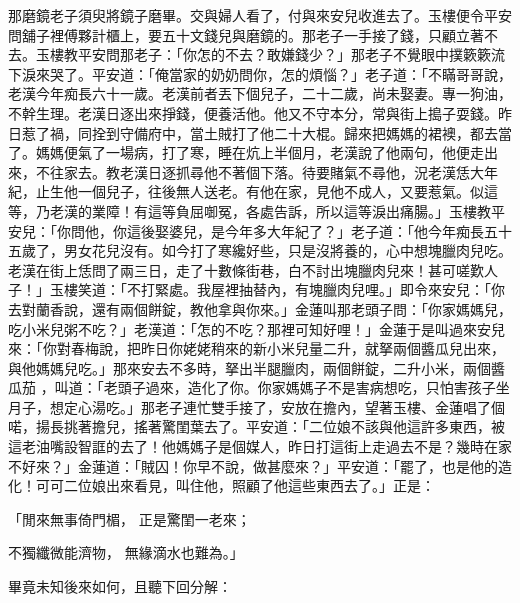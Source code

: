 那磨鏡老子須臾將鏡子磨畢。交與婦人看了，付與來安兒收進去了。玉樓便令平安問舖子裡傅夥計櫃上，要五十文錢兒與磨鏡的。那老子一手接了錢，只顧立著不去。玉樓教平安問那老子：「你怎的不去？敢嫌錢少？」那老子不覺眼中撲簌簌流下淚來哭了。平安道：「俺當家的奶奶問你，怎的煩惱？」老子道：「不瞞哥哥說，老漢今年痴長六十一歲。老漢前者丟下個兒子，二十二歲，尚未娶妻。專一狗油，不幹生理。老漢日逐出來掙錢，便養活他。他又不守本分，常與街上搗子耍錢。昨日惹了禍，同拴到守備府中，當土賊打了他二十大棍。歸來把媽媽的裙襖，都去當了。媽媽便氣了一場病，打了寒，睡在炕上半個月，老漢說了他兩句，他便走出來，不往家去。教老漢日逐抓尋他不著個下落。待要賭氣不尋他，況老漢恁大年紀，止生他一個兒子，往後無人送老。有他在家，見他不成人，又要惹氣。似這等，乃老漢的業障！有這等負屈啣冤，各處告訴，所以這等淚出痛腸。」玉樓教平安兒：「你問他，你這後娶婆兒，是今年多大年紀了？」老子道：「他今年痴長五十五歲了，男女花兒沒有。如今打了寒纔好些，只是沒將養的，心中想塊臘肉兒吃。老漢在街上恁問了兩三日，走了十數條街巷，白不討出塊臘肉兒來！甚可嗟歎人子！」玉樓笑道：「不打緊處。我屋裡抽替內，有塊臘肉兒哩。」即令來安兒：「你去對蘭香說，還有兩個餅錠，教他拿與你來。」金蓮叫那老頭子問：「你家媽媽兒，吃小米兒粥不吃？」老漢道：「怎的不吃？那裡可知好哩！」金蓮于是叫過來安兒來：「你對春梅說，把昨日你姥姥稍來的新小米兒量二升，就拏兩個醬瓜兒出來，與他媽媽兒吃。」那來安去不多時，拏出半腿臘肉，兩個餅錠，二升小米，兩個醬瓜茄 ，叫道：「老頭子過來，造化了你。你家媽媽子不是害病想吃，只怕害孩子坐月子，想定心湯吃。」那老子連忙雙手接了，安放在擔內，望著玉樓、金蓮唱了個喏，揚長挑著擔兒，搖著驚閨葉去了。平安道：「二位娘不該與他這許多東西，被這老油嘴設智誆的去了！他媽媽子是個媒人，昨日打這街上走過去不是？幾時在家不好來？」金蓮道：「賊囚！你早不說，做甚麼來？」平安道：「罷了，也是他的造化！可可二位娘出來看見，叫住他，照顧了他這些東西去了。」正是：

「閒來無事倚門楣，  正是驚閨一老來；

不獨纖微能濟物，  無緣滴水也難為。」

畢竟未知後來如何，且聽下回分解：
